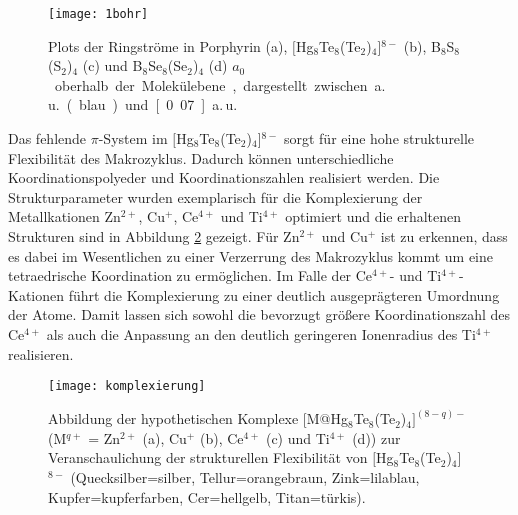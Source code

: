  

\begin{figure}[ht!]
	\centering
	\texttt{[image: 1bohr]}
	\captionsetup{figurewithin = chapter}
	\captionsetup{font=small, labelfont=bf}\caption[{Porphyrin, $[$Hg$_8$Te$_8$(Te$_2$)$_4$]$^{8-}$, B$_8$S$_8$(S$_2$)$_4$ und B$_8$Se$_8$(Se$_2$)$_4$: Plots der Ringströme}]{Plots der Ringströme in Porphyrin \textsf{(a)}, $[$Hg$_8$Te$_8$(Te$_2$)$_4$]$^{8-}$ \textsf{(b)}, B$_8$S$_8$(S$_2$)$_4$ \textsf{(c)} und B$_8$Se$_8$(Se$_2$)$_4$ \textsf{(d)} \unit[1]{$a_0$} oberhalb der Molekülebene, dargestellt zwischen \unit[0]{a.\,u.} (blau) und \unit[0.07]{a.\,u.}}
\label{abb:lic}
\end{figure}

\FloatBarrier
Das fehlende $\pi$-System im $[$Hg$_8$Te$_8$(Te$_2$)$_4$]$^{8-}$ sorgt für eine hohe strukturelle Flexibilität des Makrozyklus. Dadurch können unterschiedliche Koordinationspolyeder und Koordinationszahlen realisiert werden. Die Strukturparameter wurden exemplarisch für die Komplexierung der Metallkationen Zn$^{2+}$, Cu$^+$, Ce$^{4+}$ und Ti$^{4+}$ optimiert und die erhaltenen Strukturen sind in Abbildung \ref{abb:komplexierung} gezeigt. Für Zn$^{2+}$ und Cu$^+$ ist zu erkennen, dass es dabei im Wesentlichen zu einer Verzerrung des Makrozyklus kommt um eine tetraedrische Koordination zu ermöglichen. Im Falle der Ce$^{4+}$- und Ti$^{4+}$-Kationen führt die Komplexierung zu einer deutlich ausgeprägteren Umordnung der Atome. Damit lassen sich sowohl die bevorzugt größere Koordinationszahl des Ce$^{4+}$ als auch die Anpassung an den deutlich geringeren Ionenradius des Ti$^{4+}$ realisieren.

\begin{figure}[ht!]
	\centering
	\texttt{[image: komplexierung]}
	\captionsetup{figurewithin = chapter}
	\captionsetup{font=small, labelfont=bf}\caption[{Abbildungen der hypothetischen Komplexe [M@Hg$_8$Te$_8$(Te$_2$)$_4]^{(8-q)-}$ (M$^{q+}$ = Zn$^{2+}$, Cu$^+$ , Ce$^{4+}$ und Ti$^{4+}$)}]{{Abbildung der hypothetischen Komplexe [M@Hg$_8$Te$_8$(Te$_2$)$_4]^{(8-q)-}$ (M$^{q+}$ = Zn$^{2+}$ \textsf{(a)}, Cu$^+$ \textsf{(b)}, Ce$^{4+}$ \textsf{(c)} und Ti$^{4+}$ \textsf{(d)})} zur Veranschaulichung der strukturellen Flexibilität von $[$Hg$_8$Te$_8$(Te$_2$)$_4$]$^{8-}$ (Quecksilber=silber, Tellur=orangebraun, Zink=lilablau, Kupfer=kupferfarben, Cer=hellgelb, Titan=türkis). }
\label{abb:komplexierung}
\end{figure}


